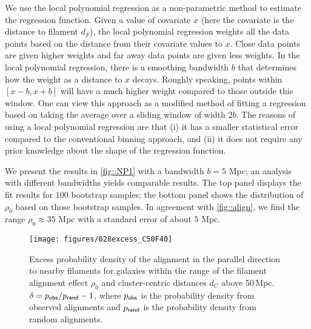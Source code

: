 \documentclass[usenatbib,useAMS]{mnras}
\theoremstyle{remark}
\newcommand{\peter}[1]{{\textcolor{green}{PM: #1}}}
\newcommand{\rachel}[1]{{\textcolor{cyan}{RM: #1}}}
\begin{document}
We use the local polynomial regression \citep{wasserman2006all} as a non-parametric method to estimate the regression function.
Given a value of covariate $x$ (here the covariate is the distance to filament $d_F$), 
the local polynomial regression weights all the data points based on the distance from their covariate values to $x$. 
Close data points are given higher weights and far away data points are given less weights.
In the local polynomial regression, there is a smoothing bandwidth $b$ that determines how the weight as a distance to $x$ decays.
Roughly speaking, points within $[x-b, x+b]$ will have a much higher weight compared to those outside this window. 
One can view this approach as a modified method of fitting a regression based on taking the average over a sliding window of width $2b$.
The reasons of using a local polynomial regression are that (i) it has a smaller statistical error compared to the conventional binning approach, and (ii) it does not require any prior knowledge about the shape of the regression function. 

We present the results in \autoref{fig::NP1} with a bandwidth $b = 5$ Mpc; an analysis with different bandwidths yields comparable results.
The top panel displays the fit results for $100$ bootstrap samples; the bottom panel shows the distribution of $\rho_0$ based on those bootstrap samples.
In agreement with \autoref{fig::align}, we find the range $\rho_0\approx 35$ Mpc with a standard error of about $5$ Mpc. 

\begin{figure}
\center
\texttt{[image: figures/028excess\_C50F40]}
\caption{
Excess probability density of the alignment in the parallel direction to nearby filaments for galaxies within the range of the filament alignment effect $\rho_0$ 
and cluster-centric distances $d_C$ above 50\,Mpc. 
$\delta = p_{\sf obs}/p_{\sf rand}-1$, where $p_{\sf obs}$ is the probability density 
from observed alignments and $p_{\sf rand}$ is the probability density from random alignments.
}
\label{fig::align_cosine}
\end{figure}
\end{document}
